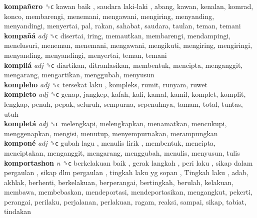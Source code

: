 \textbf{kompañero} ␝ϲ   kawan baik ,  saudara laki-laki , abang, kawan, kenalan, komrad, konco, membarengi, menemani, mengawani, mengiring, menyanding, menyandingi, menyertai, pal, rakan, sahabat, saudara, taulan, teman, temani  \\
\textbf{kompañá} \emph{adj}  ␝ϲ  disertai, iring, memautkan, membarengi, mendampingi, menelusuri, meneman, menemani, mengawani, mengikuti, mengiring, mengiringi, menyanding, menyandingi, menyertai, teman, temani  \\
\textbf{kompilá} \emph{adj}  ␝ϲ  diartikan, ditranlasikan, membentuk, mencipta, menganggit, mengarang, mengartikan, menggubah, menyusun  \\
\textbf{kompleho} \emph{adj}  ␝ϲ   tersekat laku , kompleks, rumit, runyam, ruwet  \\
\textbf{kompleto} \emph{adj}  ␝ϲ  genap, jangkep, kafah, kafi, kamal, kamil, komplet, komplit, lengkap, penuh, pepak, seluruh, sempurna, sepenuhnya, tamam, total, tuntas, utuh  \\
\textbf{kompletá} \emph{adj}  ␝ϲ  melengkapi, melengkapkan, menamatkan, mencukupi, menggenapkan, mengisi, menutup, menyempurnakan, merampungkan  \\
\textbf{komponé} \emph{adj}  ␝ϲ   gubah lagu ,  menulis lirik , membentuk, mencipta, menciptakan, menganggit, mengarang, menggubah, menulis, menyusun, tulis  \\
\textbf{komportashon} \emph{n}  ␝ϲ   berkelakuan baik ,  gerak langkah ,  peri laku ,  sikap dalam pergaulan ,  sikap dlm pergaulan ,  tingkah laku yg sopan ,  Tingkah laku , adab, akhlak, berhenti, berkelakuan, berperangai, bertingkah, berulah, kelakuan, membawa, membebaskan, mendeportasi, mendeportasikan, mengangkut, pekerti, perangai, perilaku, perjalanan, perlakuan, ragam, reaksi, sampai, sikap, tabiat, tindakan  \\
